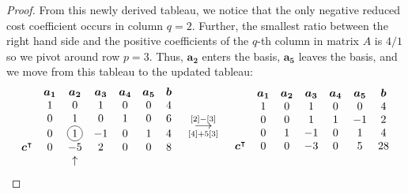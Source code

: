 \documentclass[12pt]{article}
\newcommand*\circled[1]{\tikz[baseline=(char.base)]{
            \node[shape=circle,draw,inner sep=2pt] (char) {#1};}}
\theoremstyle{definition}
\newcommand{\vect}[1]{\boldsymbol{#1}}
\newcommand{\grstep}[2][\relax]{%
   \ensuremath{\mathrel{
       {\mathop{\longrightarrow}\limits^{#2\mathstrut}_{
                                     \begin{subarray}{l} #1 \end{subarray}}}}}}
\begin{document}
\begin{proof}
  From this newly derived tableau, we notice that the only negative reduced cost coefficient
  occurs in column $q=2$. Further, the smallest ratio between the right hand side
  and the positive coefficients of the $q$-th column in matrix $A$ is $4/1$ so we pivot
  around row $p=3$. Thus, $\vect{a_2}$ enters the basis, $\vect{a_5}$ leaves the basis, and we move from this tableau to the updated tableau:
  \begin{align*}
    \begin{matrix}
      & \vect{a_1} & \vect{a_2} & \vect{a_3} & \vect{a_4} & \vect{a_5} & \vect{b} \\
                       & 1 & 0 & 1 & 0 & 0 & 4 \\
                       & 0 & 1 & 0 & 1 & 0 & 6 \\
                       & 0 & \circled{1} & -1 & 0 & 1 & 4 \\
      \vect{c}^\intercal & 0 & -5 & 2 & 0 & 0 & 8 \\
      & & \uparrow & & & & \\
    \end{matrix}
    \quad
    \begin{array}{c}
    \grstep[{[4] + 5[3]}]{[2] - [3]} \\
    \end{array}
    \quad
    \begin{matrix}
      & \vect{a_1} & \vect{a_2} & \vect{a_3} & \vect{a_4} & \vect{a_5} & \vect{b} \\
                       & 1 & 0 & 1 & 0 & 0 & 4 \\
                       & 0 & 0 & 1 & 1 & -1 & 2 \\
                       & 0 & 1 & -1 & 0 & 1 & 4 \\
      \vect{c}^\intercal & 0 & 0 & -3 & 0 & 5 & 28 \\
      & & & & & & \\
    \end{matrix}
  \end{align*}


\end{proof}
\end{document}
